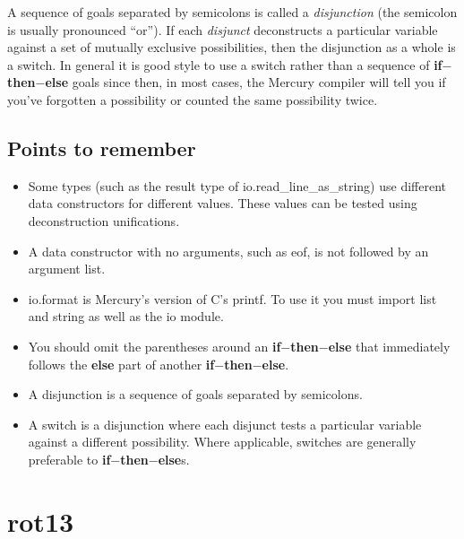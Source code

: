 \documentclass[a4paper,11pt,notitlepage,onecolumn]{book}
\begin{document}
A sequence of goals separated by semicolons is called a \emph{disjunction}
(the semicolon is usually pronounced ``or'').  If each \emph{disjunct}
deconstructs a particular variable against a set of mutually exclusive
possibilities, then the disjunction as a whole is a switch.
In general it is good style to
use a switch rather than a sequence of \textsf{\textbf{if}{\ensuremath{-}}\textbf{then}{\ensuremath{-}}\textbf{else}} goals since then, in
most cases, the Mercury compiler will tell you if you've forgotten a
possibility or counted the same possibility twice.

\subsection*{Points to remember}

\begin{itemize}
\item Some types (such as the result type of \textsf{io.read\_line\_as\_string}) use
different data constructors for different values.  These values can be
tested using deconstruction unifications.
\item A data constructor with no arguments, such as \textsf{eof}, is not followed
by an argument list.
\item \textsf{io.format} is Mercury's version of C's \textsf{printf}.  To use it you must
import \textsf{list} and \textsf{string} as well as the \textsf{io} module.
\item You should omit the parentheses around an \textsf{\textbf{if}{\ensuremath{-}}\textbf{then}{\ensuremath{-}}\textbf{else}} that
immediately follows the \textsf{\textbf{else}} part of another \textsf{\textbf{if}{\ensuremath{-}}\textbf{then}{\ensuremath{-}}\textbf{else}}.
\item A disjunction is a sequence of goals separated by semicolons.
\item A switch is a disjunction where each disjunct tests a particular
variable against a different possibility.  Where applicable, switches are
generally preferable to \textsf{\textbf{if}{\ensuremath{-}}\textbf{then}{\ensuremath{-}}\textbf{else}}s.
\end{itemize}





\newpage





\section{\textsf{rot13}}
\end{document}
